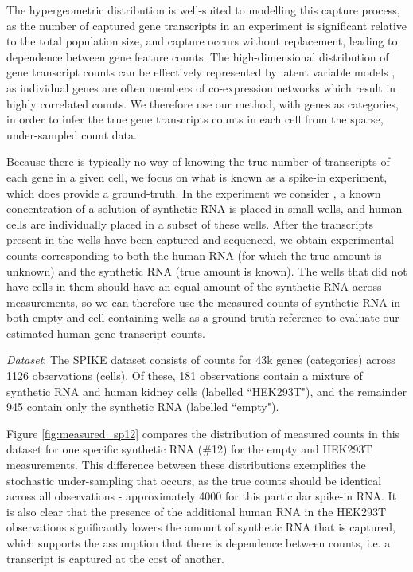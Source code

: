 \documentclass{article}
\theoremstyle{plain}
\theoremstyle{definition}
\theoremstyle{remark}
\begin{document}
The hypergeometric distribution is well-suited to modelling this capture process, as the number of captured gene transcripts in an experiment is significant relative to the total population size, and capture occurs without replacement, leading to dependence between gene feature counts. The high-dimensional distribution of gene transcript counts can be effectively represented by latent variable models \cite{lopez_deep_2018,zhao2021learning}, as individual genes are often members of co-expression networks which result in highly correlated counts. We therefore use our method, with genes as categories, in order to infer the true gene transcripts counts in each cell from the sparse, under-sampled count data.

Because there is typically no way of knowing the true number of transcripts of each gene in a given cell, we focus on what is known as a spike-in experiment, which does provide a ground-truth. In the experiment we consider \citep{ziegenhain_molecular_2022}, a known concentration of a solution of synthetic RNA is placed in small wells, and human cells are individually placed in a subset of these wells. After the transcripts present in the wells have been captured and sequenced, we obtain experimental counts corresponding to both the human RNA (for which the true amount is unknown) and the synthetic RNA (true amount is known). The wells that did not have cells in them should have an equal amount of the synthetic RNA across measurements, so we can therefore use the measured counts of synthetic RNA in both empty and cell-containing wells as a ground-truth reference to evaluate our estimated human gene transcript counts.

\textit{Dataset}: The SPIKE dataset consists of counts for 43k genes (categories) across 1126 observations (cells). Of these, 181 observations contain a mixture of synthetic RNA and human kidney cells (labelled ``HEK293T"), and the remainder 945 contain only the synthetic RNA (labelled ``empty").

Figure \ref{fig:measured_sp12} compares the distribution of measured counts in this dataset for one specific synthetic RNA (\#12) for the empty and HEK293T measurements. This difference between these distributions exemplifies the stochastic under-sampling that occurs, as the true counts should be identical across all observations - approximately 4000 for this particular spike-in RNA. It is also clear that the presence of the additional human RNA in the HEK293T observations significantly lowers the amount of synthetic RNA that is captured, which supports the assumption that there is dependence between counts, i.e. a transcript is captured at the cost of another.
\end{document}
